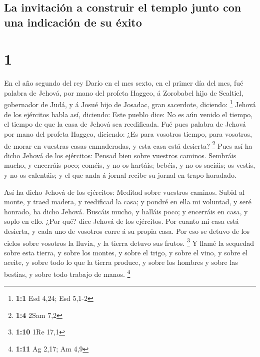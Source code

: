 \hypertarget{la-invitaciuxf3n-a-construir-el-templo-junto-con-una-indicaciuxf3n-de-su-uxe9xito}{%
\subsection{La invitación a construir el templo junto con una indicación
de su
éxito}\label{la-invitaciuxf3n-a-construir-el-templo-junto-con-una-indicaciuxf3n-de-su-uxe9xito}}

\hypertarget{section}{%
\section{1}\label{section}}

 En el año segundo del rey Darío en el mes sexto, en el
primer día del mes, fué palabra de Jehová, por mano del profeta Haggeo,
á Zorobabel hijo de Sealtiel, gobernador de Judá, y á Josué hijo de
Josadac, gran sacerdote, diciendo: \footnote{\textbf{1:1} Esd 4,24; Esd
  5,1-2}  Jehová de los ejércitos habla así, diciendo:
Este pueblo dice: No es aún venido el tiempo, el tiempo de que la casa
de Jehová sea reedificada.  Fué pues palabra de Jehová por
mano del profeta Haggeo, diciendo:  ¿Es para vosotros
tiempo, para vosotros, de morar en vuestras casas enmaderadas, y esta
casa está desierta? \footnote{\textbf{1:4} 2Sam 7,2}  Pues
así ha dicho Jehová de los ejércitos: Pensad bien sobre vuestros
caminos.  Sembráis mucho, y encerráis poco; coméis, y no
os hartáis; bebéis, y no os saciáis; os vestís, y no os calentáis; y el
que anda á jornal recibe su jornal en trapo horadado.

 Así ha dicho Jehová de los ejércitos: Meditad sobre
vuestros caminos.  Subid al monte, y traed madera, y
reedificad la casa; y pondré en ella mi voluntad, y seré honrado, ha
dicho Jehová.  Buscáis mucho, y halláis poco; y encerráis
en casa, y soplo en ello. ¿Por qué? dice Jehová de los ejércitos. Por
cuanto mi casa está desierta, y cada uno de vosotros corre á su propia
casa.  Por eso se detuvo de los cielos sobre vosotros la
lluvia, y la tierra detuvo sus frutos. \footnote{\textbf{1:10} 1Re 17,1}
 Y llamé la sequedad sobre esta tierra, y sobre los
montes, y sobre el trigo, y sobre el vino, y sobre el aceite, y sobre
todo lo que la tierra produce, y sobre los hombres y sobre las bestias,
y sobre todo trabajo de manos. \footnote{\textbf{1:11} Ag 2,17; Am 4,9}

